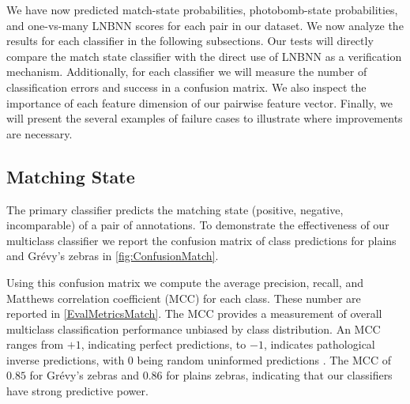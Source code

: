     We have now predicted match-state probabilities, photobomb-state
      probabilities, and one-vs-many LNBNN scores for each pair in our dataset.
    We now analyze the results for each classifier in the following
      subsections.
    Our tests will directly compare the match state classifier with the direct
      use of LNBNN as a verification mechanism.
    Additionally, for each classifier we will measure the number of
      classification errors and success in a confusion matrix.
    We also inspect the importance of each feature dimension of our pairwise
      feature vector.
    Finally, we will present the several examples of failure cases to
      illustrate where improvements are necessary.




    \subsection{Matching State}

        The primary classifier predicts the matching state (positive,
          negative, incomparable) of a pair of annotations.
        To demonstrate the effectiveness of our multiclass classifier we
          report the confusion matrix of class predictions for plains and
          Grévy's zebras in \cref{fig:ConfusionMatch}.

        \ConfusionMatch{}

        \EvalMetricsMatch{}

        Using this confusion matrix we compute the average precision, recall,
          and Matthews correlation coefficient (MCC) for each class.
        These number are reported in \cref{EvalMetricsMatch}.
        The MCC provides a measurement of overall multiclass classification
          performance unbiased by class distribution.
        An MCC ranges from $+1$, indicating perfect predictions, to $-1$,
          indicates pathological inverse predictions, with $0$ being random
          uninformed predictions \cite{powers_evaluation_2011}.
        The MCC of $0.85$ for Grévy's zebras and $0.86$ for plains zebras,
          indicating that our classifiers have strong predictive power.
        

